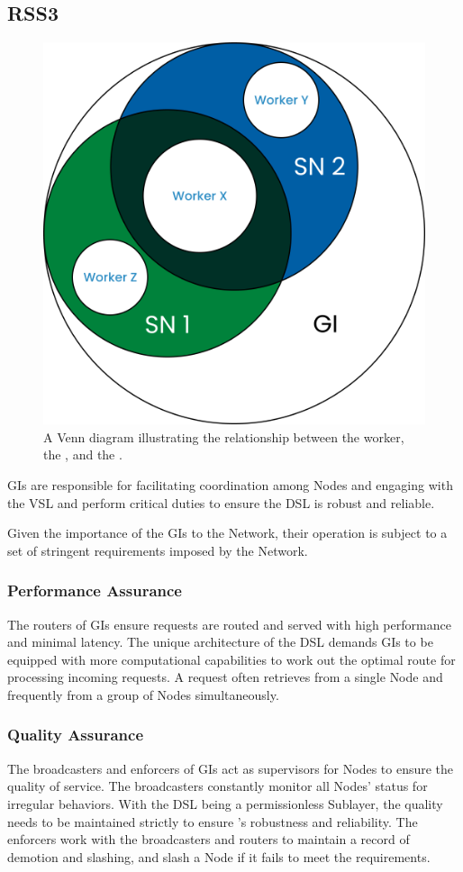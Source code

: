 \subsection{RSS3 }
\label{subsec:GI}

{
    \begin{figure}[tb!]
        \centering
        \includegraphics[width=0.7\columnwidth]{figures/GI.png}
        \caption{A Venn diagram illustrating the relationship between the worker, the , and the .}
        \label{fig:GI}
    \end{figure}
}

\glspl{GI} are responsible for facilitating coordination among \glspl{Node} and engaging with the \gls{VSL} and perform critical duties to ensure the \gls{DSL} is robust and reliable.

Given the importance of the \glspl{GI} to the Network, their operation is subject to a set of stringent requirements imposed by the Network.

\subsubsection{Performance Assurance} The routers of \glspl{GI} ensure requests are routed and served with high performance and minimal latency.
The unique architecture of the \gls{DSL} demands \glspl{GI} to be equipped with more computational capabilities to work out the optimal route for processing incoming requests. A request often retrieves  from a single \gls{Node} and frequently from a group of \glspl{Node} simultaneously.

\subsubsection{Quality Assurance} The broadcasters and enforcers of \glspl{GI} act as supervisors for \glspl{Node} to ensure the quality of service. The broadcasters constantly monitor all \glspl{Node}' status for irregular behaviors. With the \gls{DSL} being a permissionless Sublayer, the quality needs to be maintained strictly to ensure 's robustness and reliability.
The enforcers work with the broadcasters and routers to maintain a record of demotion and slashing, and slash a \gls{Node} if it fails to meet the requirements.


